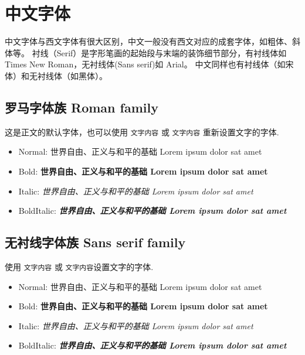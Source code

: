 \section{中文字体}

中文字体与西文字体有很大区别，中文一般没有西文对应的成套字体，如粗体、斜体等。
衬线（Serif）是字形笔画的起始段与末端的装饰细节部分，有衬线体如Times New Roman，无衬线体(Sans serif)如 Arial。
中文同样也有衬线体（如宋体）和无衬线体（如黑体）。

\subsection{罗马字体族 Roman family}

这是正文的默认字体，也可以使用 \texttt{\textrm{文字内容}} 或 \texttt{{\rmfamily 文字内容}} 重新设置文字的字体.

\begin{itemize}
  \item Normal: {\rmfamily \mdseries 世界自由、正义与和平的基础 Lorem ipsum dolor sat amet}
  \item Bold: {\rmfamily \bfseries 世界自由、正义与和平的基础 Lorem ipsum dolor sat amet}
  \item Italic: {\rmfamily \itshape 世界自由、正义与和平的基础 Lorem ipsum dolor sat amet}
  \item BoldItalic: {\rmfamily \bfseries \itshape 世界自由、正义与和平的基础 Lorem ipsum dolor sat amet}
\end{itemize}

\subsection{无衬线字体族 Sans serif family}

使用 \texttt{\textsf{文字内容}} 或 \texttt{{\sffamily 文字内容}}设置文字的字体.

\begin{itemize}
  \item Normal: {\sffamily \mdseries 世界自由、正义与和平的基础 Lorem ipsum dolor sat amet}
  \item Bold: {\sffamily \bfseries 世界自由、正义与和平的基础 Lorem ipsum dolor sat amet}
  \item Italic: {\sffamily \itshape 世界自由、正义与和平的基础 Lorem ipsum dolor sat amet}
  \item BoldItalic: {\sffamily \bfseries \itshape 世界自由、正义与和平的基础 Lorem ipsum dolor sat amet}
\end{itemize}

